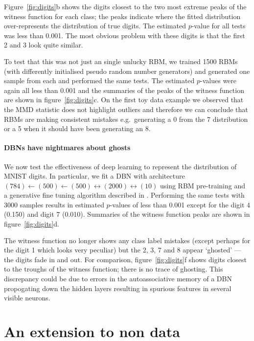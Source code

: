 \documentclass{article} %
\def\eg{e.g.\ }
\begin{document}
Figure~\ref{fig:digits}b shows the digits closest to the two most extreme peaks of the witness function for each class; the peaks indicate where the fitted distribution over-represents the distribution of true digits.
The estimated $p$-value for all tests was less than 0.001.
The most obvious problem with these digits is that the first 2 and 3 look quite similar.

To test that this was not just an single unlucky RBM, we trained 1500 RBMs (with differently initialised pseudo random number generators) and generated one sample from each and performed the same tests.
The estimated $p$-values were again all less than 0.001 and the summaries of the peaks of the witness function are shown in figure~\ref{fig:digits}c.
On the first toy data example we observed that the MMD statistic does not highlight outliers and therefore we can conclude that RBMs are making consistent mistakes \eg generating a 0 from the 7 distribution or a 5 when it should have been generating an 8.

\paragraph{DBNs have nightmares about ghosts}

We now test the effectiveness of deep learning to represent the distribution of MNIST digits.
In particular, we fit a DBN with architecture $(784)\leftarrow(500)\leftarrow(500)\leftrightarrow(2000)\leftrightarrow(10)$ using RBM pre-training and a generative fine tuning algorithm described in \cite{Hinton2006-yw}.
Performing the same tests with 3000 samples results in estimated $p$-values of less than 0.001 except for the digit 4 (0.150) and digit 7 (0.010).
Summaries of the witness function peaks are shown in figure~\ref{fig:digits}d.

The witness function no longer shows any class label mistakes (except perhaps for the digit 1 which looks very peculiar) but the 2, 3, 7 and 8 appear `ghosted' --- the digits fade in and out.
For comparison, figure~\ref{fig:digits}f shows digits closest to the troughs of the witness function; there is no trace of ghosting.
This discrepancy could be due to errors in the autoassociative memory of a DBN propogating down the hidden layers resulting in spurious features in several visible neurons.

\section{An extension to non \iid data}
\label{sec:non_iid}
\end{document}
